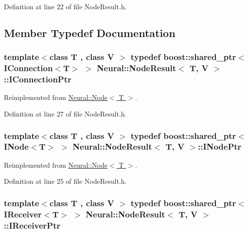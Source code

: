 Definition at line 22 of file NodeResult.h.



\subsection{Member Typedef Documentation}
\hypertarget{class_neural_1_1_node_result_adff4d0f9fa1cfcafd13113a00b7a3ff7}{
\subsubsection[{IConnectionPtr}]{\setlength{\rightskip}{0pt plus 5cm}template$<$class T , class V $>$ typedef boost::shared\_\-ptr$<$ {\bf IConnection}$<$T$>$ $>$ {\bf Neural::NodeResult}$<$ T, V $>$::{\bf IConnectionPtr}}}
\label{class_neural_1_1_node_result_adff4d0f9fa1cfcafd13113a00b7a3ff7}


Reimplemented from \hyperlink{class_neural_1_1_node_ac797b836161befa12cd9897926139c14}{Neural::Node$<$ T $>$}.



Definition at line 27 of file NodeResult.h.

\hypertarget{class_neural_1_1_node_result_a709f0bb8f0b486a686967e5b3a2b7142}{
\subsubsection[{INodePtr}]{\setlength{\rightskip}{0pt plus 5cm}template$<$class T , class V $>$ typedef boost::shared\_\-ptr$<$ {\bf INode}$<$T$>$ $>$ {\bf Neural::NodeResult}$<$ T, V $>$::{\bf INodePtr}}}
\label{class_neural_1_1_node_result_a709f0bb8f0b486a686967e5b3a2b7142}


Reimplemented from \hyperlink{class_neural_1_1_node_ae2242f73792c89cebc4403da7b2b1a7e}{Neural::Node$<$ T $>$}.



Definition at line 25 of file NodeResult.h.

\hypertarget{class_neural_1_1_node_result_aa3b43d495589b9b438ff84d41ac5b00d}{
\subsubsection[{IReceiverPtr}]{\setlength{\rightskip}{0pt plus 5cm}template$<$class T , class V $>$ typedef boost::shared\_\-ptr$<$ {\bf IReceiver}$<$T$>$ $>$ {\bf Neural::NodeResult}$<$ T, V $>$::{\bf IReceiverPtr}}}
\label{class_neural_1_1_node_result_aa3b43d495589b9b438ff84d41ac5b00d}


